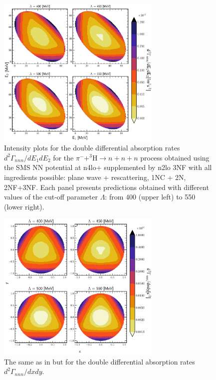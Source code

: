     \begin{figure}[h]
        \begin{center}
        \includegraphics[width=0.7\textwidth]{PlotData/PION/Dalitz_maps/figures/Dalitz_map_nnn_E1E2_cutofs.pdf}
        \end{center}
        \caption{Intensity plots for the double differential absorption rates
        $d^2 \Gamma_{nnn}/dE_1dE_2$ for the $\pi^- + ^3\text{H} \rightarrow n + n + n$
        process obtained using the SMS NN potential at \gls{n4lo+} supplemented by \gls{n2lo} 3NF
        with all ingredients possible: plane wave + rescattering, 1NC + 2N, 2NF+3NF.
        Each panel presents predictions obtained with different values of the cut-off parameter $\Lambda$:
        from \SI{400}{\mev} (upper left) to \SI{550}{\mev} (lower right).}
        \label{pion_nnn_E1E2_cutoff}
    \end{figure}

    \begin{figure}[h]
        \begin{center}
        \includegraphics[width=0.7\textwidth]{PlotData/PION/Dalitz_maps/figures/Dalitz_map_nnn_xy_cutofs.pdf}
        \end{center}
        \caption{The same as in  but for the double differential absorption rates
        $d^2 \Gamma_{nnn}/dxdy$.}
        \label{pion_nnn_xy_cutoff}
    \end{figure}


